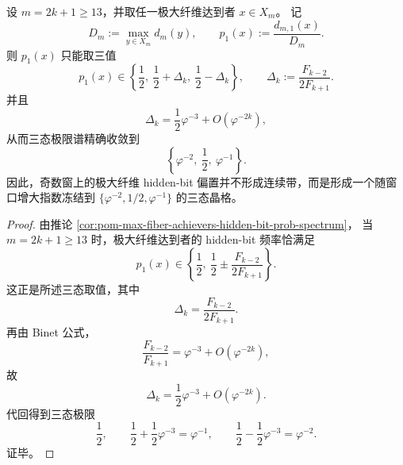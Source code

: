 \begin{theorem}\label{thm:conclusion-odd-maxfiber-hiddenbit-tristate-crystal}
设 \(m=2k+1\ge 13\)，并取任一极大纤维达到者 \(x\in X_m\)。
记
\[
D_m:=\max_{y\in X_m}d_m(y),
\qquad
p_1(x):=\frac{d_{m,1}(x)}{D_m}.
\]
则 \(p_1(x)\) 只能取三值
\[
p_1(x)\in
\left\{
\frac12,\ \frac12+\Delta_k,\ \frac12-\Delta_k
\right\},
\qquad
\Delta_k:=\frac{F_{k-2}}{2F_{k+1}}.
\]
并且
\[
\Delta_k=\frac12\varphi^{-3}+O(\varphi^{-2k}),
\]
从而三态极限谱精确收敛到
\[
\left\{
\varphi^{-2},\ \frac12,\ \varphi^{-1}
\right\}.
\]
因此，奇数窗上的极大纤维 hidden-bit 偏置并不形成连续带，而是形成一个随窗口增大指数冻结到
\(\{\varphi^{-2},1/2,\varphi^{-1}\}\) 的三态晶格。
\end{theorem}

\begin{proof}
由推论 \ref{cor:pom-max-fiber-achievers-hidden-bit-prob-spectrum}，
当 \(m=2k+1\ge 13\) 时，极大纤维达到者的 hidden-bit 频率恰满足
\[
p_1(x)\in
\left\{
\frac12,\ \frac12\pm\frac{F_{k-2}}{2F_{k+1}}
\right\}.
\]
这正是所述三态取值，其中
\[
\Delta_k=\frac{F_{k-2}}{2F_{k+1}}.
\]
再由 Binet 公式，
\[
\frac{F_{k-2}}{F_{k+1}}=\varphi^{-3}+O(\varphi^{-2k}),
\]
故
\[
\Delta_k=\frac12\varphi^{-3}+O(\varphi^{-2k}).
\]
代回得到三态极限
\[
\frac12,\qquad
\frac12+\frac12\varphi^{-3}=\varphi^{-1},
\qquad
\frac12-\frac12\varphi^{-3}=\varphi^{-2}.
\]
证毕。
\end{proof}
